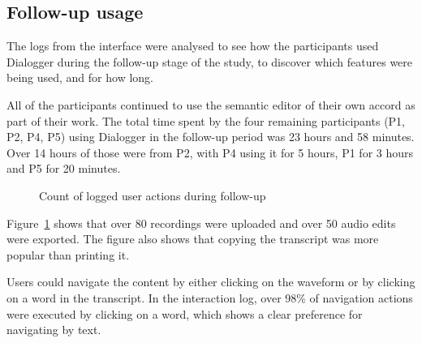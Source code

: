 \subsection{Follow-up usage}
The logs from the interface were analysed to see how the participants used
Dialogger during the follow-up stage of the study, to discover which features
were being used, and for how long.

All of the participants continued to use the semantic editor of their own
accord as part of their work. The total time spent by the four remaining
participants (P1, P2, P4, P5) using Dialogger in the follow-up period was 23 hours
and 58 minutes.  Over 14 hours of those were from P2, with P4 using it for 5
hours, P1 for 3 hours and P5 for 20 minutes.

\begin{figure}
\centering
  \caption{Count of logged user actions during follow-up}
  \label{fig:actions}
\end{figure}

Figure~\ref{fig:actions} shows that over 80 recordings were uploaded and over
50 audio edits were exported. The figure also shows that copying the transcript
was more popular than printing it.

Users could navigate the content by either clicking on the waveform or by
clicking on a word in the transcript. In the interaction log, over 98\% of
navigation actions were executed by clicking on a word, which shows a clear
preference for navigating by text.


